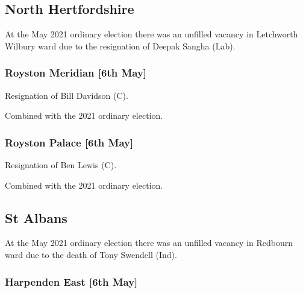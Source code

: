 \documentclass[a4paper,openany]{book}
\begin{document}
\begin{resultsiii}
\subsection*{North Hertfordshire}

At the May 2021 ordinary election there was an unfilled vacancy in Letchworth Wilbury ward due to the resignation of Deepak Sangha (Lab).

\subsubsection*{Royston Meridian \hspace*{\fill}\nolinebreak[1]%
	\enspace\hspace*{\fill}
	[6th May]}


Resignation of Bill Davidson (C).

Combined with the 2021 ordinary election.

\subsubsection*{Royston Palace \hspace*{\fill}\nolinebreak[1]%
	\enspace\hspace*{\fill}
	[6th May]}


Resignation of Ben Lewis (C).

Combined with the 2021 ordinary election.

\subsection*{St Albans}

At the May 2021 ordinary election there was an unfilled vacancy in Redbourn ward due to the death of Tony Swendell (Ind).

\subsubsection*{Harpenden East \hspace*{\fill}\nolinebreak[1]%
	\enspace\hspace*{\fill}
	[6th May]}


\end{resultsiii}
\end{document}
